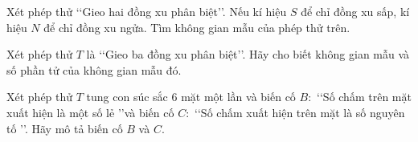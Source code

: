 \begin{vd}%
	Xét phép thử \lq\lq Gieo hai đồng xu phân biệt\rq\rq. Nếu kí hiệu $S$ để chỉ đồng xu sấp, kí hiệu $N$ để chỉ đồng xu ngửa. Tìm không gian mẫu của phép thử trên.
	
\end{vd}

\begin{vd}%
	Xét phép thử $T$ là \lq\lq Gieo ba đồng xu phân biệt\rq\rq. Hãy cho biết không gian mẫu và số phần tử của không gian mẫu đó.
\end{vd}

\begin{vd}%
	Xét phép thử $T$ tung con súc sắc $6$ mặt một lần và biến cố $B\colon $ \lq\lq Số chấm trên mặt xuất hiện là một số lẻ \rq\rq và biến cố $C\colon $ \lq\lq Số chấm xuất hiện trên mặt là số nguyên tố \rq\rq. Hãy mô tả biến cố $B$ và $C$.
\end{vd}


